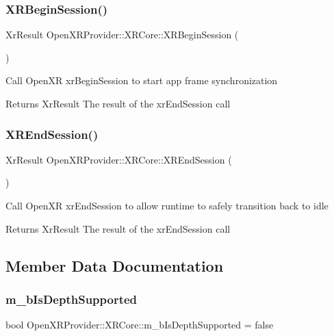 \subsubsection{\texorpdfstring{XRBeginSession()}{XRBeginSession()}}
{\footnotesize\ttfamily Xr\+Result Open\+X\+R\+Provider\+::\+X\+R\+Core\+::\+X\+R\+Begin\+Session (\begin{DoxyParamCaption}{ }\end{DoxyParamCaption})}

Call Open\+XR xr\+Begin\+Session to start app frame synchronization \begin{DoxyReturn}{Returns}
Xr\+Result The result of the xr\+End\+Session call 
\end{DoxyReturn}
\mbox{\label{class_open_x_r_provider_1_1_x_r_core_a361a44f9b5cbda73bdede6c45dd6078b}} 
\subsubsection{\texorpdfstring{XREndSession()}{XREndSession()}}
{\footnotesize\ttfamily Xr\+Result Open\+X\+R\+Provider\+::\+X\+R\+Core\+::\+X\+R\+End\+Session (\begin{DoxyParamCaption}{ }\end{DoxyParamCaption})}

Call Open\+XR xr\+End\+Session to allow runtime to safely transition back to idle \begin{DoxyReturn}{Returns}
Xr\+Result The result of the xr\+End\+Session call 
\end{DoxyReturn}


\subsection{Member Data Documentation}
\mbox{\label{class_open_x_r_provider_1_1_x_r_core_a68aaefb616672a47a05370fc9bed91f0}} 
\subsubsection{\texorpdfstring{m\_bIsDepthSupported}{m\_bIsDepthSupported}}
{\footnotesize\ttfamily bool Open\+X\+R\+Provider\+::\+X\+R\+Core\+::m\+\_\+b\+Is\+Depth\+Supported = false\hspace{0.3cm}{\ttfamily [private]}}



